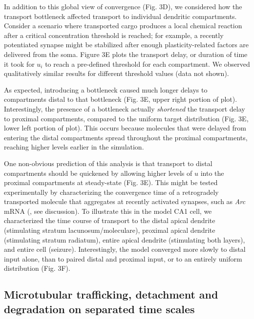 \documentclass[fleqn,10pt]{wlpeerj}
\begin{document}
In addition to this global view of convergence (Fig. 3D), we considered how the transport bottleneck affected transport to individual dendritic compartments. Consider a scenario where transported cargo produces a local chemical reaction after a critical concentration threshold is reached; for example, a recently potentiated synapse might be stabilized after enough plasticity-related factors are delivered from the soma. Figure 3E plots the transport delay, or duration of time it took for $u_i$ to reach a pre-defined threshold for each compartment. We observed qualitatively similar results for different threshold values (data not shown).

As expected, introducing a bottleneck caused much longer delays to compartments distal to that bottleneck (Fig. 3E, upper right portion of plot). Interestingly, the presence of a bottleneck actually \textit{shortened} the transport delay to proximal compartments, compared to the uniform target distribution (Fig. 3E, lower left portion of plot). This occurs because molecules that were delayed from entering the distal compartments spread throughout the proximal compartments, reaching higher levels earlier in the simulation.

One non-obvious prediction of this analysis is that transport to distal compartments should be quickened by allowing higher levels of $u$ into the proximal compartments at steady-state (Fig. 3E). This might be tested experimentally by characterizing the convergence time of a retrogradely transported molecule that aggregates at recently activated synapses, such as \textit{Arc} mRNA (\citet{Steward_1998}, see discussion). To illustrate this in the model CA1 cell, we characterized the time course of transport to the distal apical dendrite (stimulating stratum lacunosum/moleculare), proximal apical dendrite (stimulating stratum radiatum), entire apical dendrite (stimulating both layers), and entire cell (seizure). Interestingly, the model converged more slowly to distal input alone, than to paired distal and proximal input, or to an entirely uniform distribution (Fig. 3F).

\subsection*{Microtubular trafficking, detachment and degradation on separated time scales}
\end{document}
